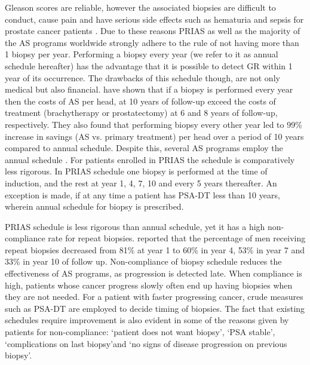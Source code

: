 Gleason scores are reliable, however the associated biopsies are difficult to conduct, cause pain and have serious side effects such as hematuria and sepsis for prostate cancer patients \citep{loeb2013systematic}. Due to these reasons PRIAS as well as the majority of the AS programs worldwide strongly adhere to the rule of not having more than 1 biopsy per year. Performing a biopsy every year (we refer to it as annual schedule hereafter) has the advantage that it is possible to detect GR within 1 year of its occurrence. The drawbacks of this schedule though, are not only medical but also financial. \cite{keegan2012active} have shown that if a biopsy is performed every year then the costs of AS per head, at 10 years of follow-up exceed the costs of treatment (brachytherapy or prostatectomy) at 6 and 8 years of follow-up, respectively. They also found that performing biopsy every other year led to 99\% increase in savings (AS vs. primary treatment) per head over a period of 10 years compared to annual schedule. Despite this, several AS programs employ the annual schedule \citep{tosoian2011active,welty2015extended}. For patients enrolled in PRIAS the schedule is comparatively less rigorous. In PRIAS schedule one biopsy is performed at the time of induction, and the rest at year 1, 4, 7, 10 and every 5 years thereafter. An exception is made, if at any time a patient has PSA-DT less than 10 years, wherein annual schedule for biopsy is prescribed.

PRIAS schedule is less rigorous than annual schedule, yet it has a high non-compliance rate for repeat biopsies. \cite{bokhorst2015compliance} reported that the percentage of men receiving repeat biopsies decreased from 81\% at year 1 to 60\% in year 4, 53\% in year 7 and 33\% in year 10 of follow up. Non-compliance of biopsy schedule reduces the effectiveness of AS programs, as progression is detected late. When compliance is high, patients whose cancer progress slowly often end up having biopsies when they are not needed. For a patient with faster progressing cancer, crude measures such as PSA-DT are employed to decide timing of biopsies. The fact that existing schedules require improvement is also evident in some of the reasons given by patients for non-compliance: \textquoteleft patient does not want biopsy\textquoteright, \textquoteleft PSA stable\textquoteright, \textquoteleft complications on last biopsy\textquoteright and \textquoteleft no signs of disease progression on previous biopsy\textquoteright.

